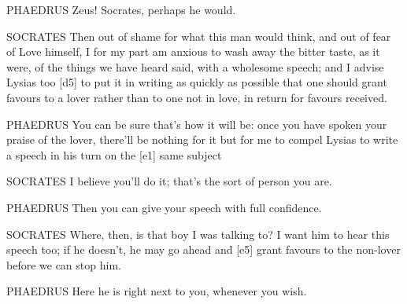PHAEDRUS Zeus! Socrates, perhaps he would.

SOCRATES Then out of shame for what this man would think, and out of
fear of Love himself, I for my part am anxious to wash away the bitter
taste, as it were, of the things we have heard said, with a wholesome
speech; and I advise Lysias too {[}d5{]} to put it in writing as quickly
as possible that one should grant favours to a lover rather than to one
not in love, in return for favours
received.

PHAEDRUS You can be sure that's how it will be: once you have spoken
your praise of the lover, there'll be nothing for it but for me to
compel Lysias to write a speech in his turn on the {[}e1{]} same subject

SOCRATES I believe you'll do it; that's the sort of person you are.

PHAEDRUS Then you can give your speech with full confidence.

SOCRATES Where, then, is that boy I was talking to? I want him to hear
this speech too; if he doesn't, he may go ahead and {[}e5{]} grant
favours to the non-lover before we can stop him.

PHAEDRUS Here he is right next to you, whenever you
wish.

